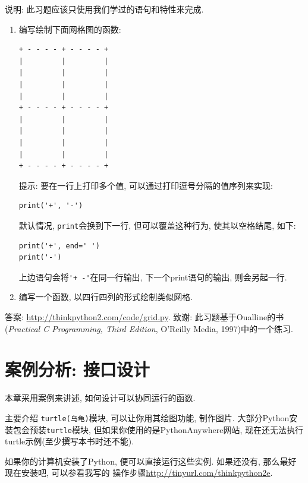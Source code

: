 \documentclass[10pt]{book}
\begin{document}
\begin{exercise}

说明: 此习题应该只使用我们学过的语句和特性来完成. 

\begin{enumerate}

\item 编写绘制下面网格图的函数:

\begin{verbatim}
+ - - - - + - - - - +
|         |         |
|         |         |
|         |         |
|         |         |
+ - - - - + - - - - +
|         |         |
|         |         |
|         |         |
|         |         |
+ - - - - + - - - - +
\end{verbatim}
%
提示: 要在一行上打印多个值, 可以通过打印逗号分隔的值序列来实现:

\begin{verbatim}
print('+', '-')
\end{verbatim}
%
默认情况, {\tt print}会换到下一行, 但可以覆盖这种行为, 
使其以空格结尾, 如下:

\begin{verbatim}
print('+', end=' ')
print('-')
\end{verbatim}
%
上边语句会将\verb"'+ -'"在同一行输出, 下一个print语句的输出, 则会另起一行. 

\item 编写一个函数, 以四行四列的形式绘制类似网格. 

\end{enumerate}

答案: \url{http://thinkpython2.com/code/grid.py}.
致谢: 此习题基于Oualline的书
({\em Practical C Programming, Third Edition},  
O'Reilly Media, 1997)中的一个练习.

\end{exercise}


\chapter{案例分析: 接口设计}
\label{turtlechap}

本章采用案例来讲述, 如何设计可以协同运行的函数. 

主要介绍 {\tt turtle(乌龟)}模块, 可以让你用其绘图功能, 制作图片. 
大部分Python安装包会预装{\tt turtle}模块, 但如果你使用的是PythonAnywhere网站, 
现在还无法执行turtle示例(至少撰写本书时还不能). 

如果你的计算机安装了Python, 便可以直接运行这些实例. 
如果还没有, 那么最好现在安装吧, 可以参看我写的
操作步骤\url{http://tinyurl.com/thinkpython2e}. 
\end{document}
